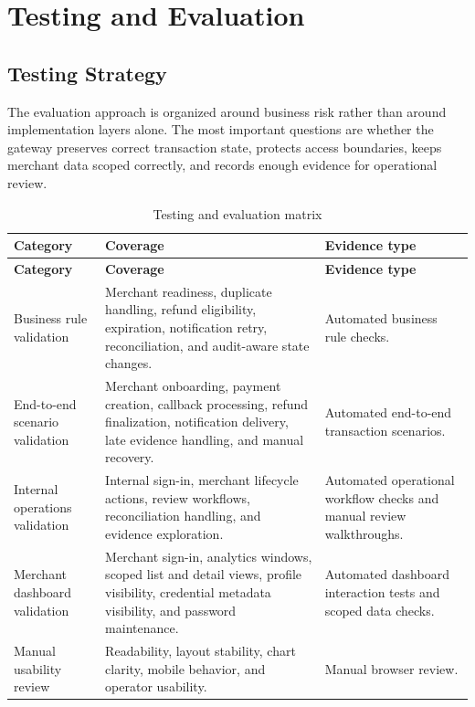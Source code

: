 \chapter{Testing and Evaluation}

\section{Testing Strategy}

The evaluation approach is organized around business risk rather than around
implementation layers alone. The most important questions are whether the
gateway preserves correct transaction state, protects access boundaries, keeps
merchant data scoped correctly, and records enough evidence for operational
review.

\begin{longtable}{L{0.22\textwidth}L{0.36\textwidth}L{0.32\textwidth}}
\caption{Testing and evaluation matrix}\\
\toprule
\textbf{Category} & \textbf{Coverage} & \textbf{Evidence type} \\
\midrule
\endfirsthead
\toprule
\textbf{Category} & \textbf{Coverage} & \textbf{Evidence type} \\
\midrule
\endhead
Business rule validation & Merchant readiness, duplicate handling, refund eligibility, expiration, notification retry, reconciliation, and audit-aware state changes. & Automated business rule checks. \\
\bodyrowrule
End-to-end scenario validation & Merchant onboarding, payment creation, callback processing, refund finalization, notification delivery, late evidence handling, and manual recovery. & Automated end-to-end transaction scenarios. \\
\bodyrowrule
Internal operations validation & Internal sign-in, merchant lifecycle actions, review workflows, reconciliation handling, and evidence exploration. & Automated operational workflow checks and manual review walkthroughs. \\
\bodyrowrule
Merchant dashboard validation & Merchant sign-in, analytics windows, scoped list and detail views, profile visibility, credential metadata visibility, and password maintenance. & Automated dashboard interaction tests and scoped data checks. \\
\bodyrowrule
Manual usability review & Readability, layout stability, chart clarity, mobile behavior, and operator usability. & Manual browser review. \\
\bottomrule
\end{longtable}

